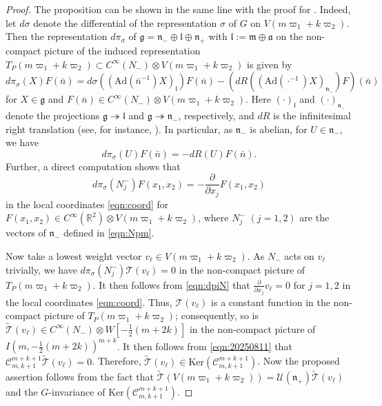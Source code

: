 \documentclass[reqno,11pt]{amsart}
\theoremstyle{remark}
\numberwithin{equation}{section}
\newcommand{\fa}{{\mathfrak a}}
\newcommand{\fg}{{\mathfrak g}}
\newcommand{\fl}{{\mathfrak l}}
\newcommand{\fm}{{\mathfrak m}}
\newcommand{\fn}{{\mathfrak n}}
\newcommand{\R}{\mathbb{R}}
\newcommand{\Ad}{\mathrm{Ad}}
\newcommand{\Cal}{\mathcal}
\newcommand{\wT}{\widetilde{\Cal{T}}}
\newcommand{\Ker}{\mathrm{Ker}}
\begin{document}
\begin{proof}
The proposition can be shown 
in the same line with the proof for \cite[Thm.\ 6.5]{KuOr25a}.
Indeed, let $d\sigma$ denote the differential of the representation $\sigma$ 
of $G$ on $V(m\varpi_1+k\varpi_2)$.
Then the representation $d\pi_\sigma$ of
$\fg=\fn_-\oplus \fl \oplus \fn_+$ with $\fl:=\fm\oplus \fa$ 
on the non-compact picture of the induced representation
$T_P(m\varpi_1 + k \varpi_2)  \subset C^\infty(N_-)\otimes V(m\varpi_1+k\varpi_2)$
is given by 
\begin{equation}\label{eqn:dpi}
d\pi_\sigma(X) F(\bar{n})= 
d\sigma((\Ad(\bar{n}^{-1})X)_{\fl})F(\bar{n})-(dR((\Ad(\cdot^{-1})X)_{\fn_-})F)(\bar{n})
\end{equation}
for $X \in \fg$ and $F(\bar{n})\in C^\infty(N_-)\otimes  V(m\varpi_1 + k \varpi_2)$.
Here $(\cdot)_{\fl}$ and $(\cdot)_{\fn_-}$ denote the projections 
$\fg \twoheadrightarrow \fl$ and 
$\fg \twoheadrightarrow \fn_-$, respectively,
and $dR$ is the infinitesimal right translation (see, for instance, \cite[(2.4)]{KuOr25a}). 
In particular, as $\fn_-$ is abelian, for $U \in \fn_-$,  we have 
\begin{equation*}
d\pi_\sigma(U)F(\bar{n})=-dR(U)F(\bar{n}).
\end{equation*}
Further, a direct computation shows that
\begin{equation}\label{eqn:dpiN}
d\pi_\sigma(N^-_j)F(x_1, x_2) = -\frac{\partial}{\partial x_j}F(x_1, x_2)
\end{equation}
in the local coordinates \eqref{eqn:coord}
for $F(x_1, x_2) \in C^\infty(\R^2) \otimes V(m\varpi_1+k\varpi_2)$,
where $N_j^-$ $(j=1,2)$ are the vectors of $\fn_-$ defined in \eqref{eqn:Npm}.

Now take a lowest weight vector $v_\ell \in V(m\varpi_1 + k \varpi_2)$.
As $N_-$ acts on $v_\ell$ trivially, we have 
$d\pi_\sigma(N_j^-)\Cal{T}(v_\ell)=0$
in the non-compact picture of 
$T_P(m\varpi_1 + k \varpi_2)$.
It then follows from \eqref{eqn:dpiN} that
$\frac{\partial}{\partial x_j} v_\ell = 0$ for $j=1, 2$
in the local coordinates \eqref{eqn:coord}. Thus, $\Cal{T}(v_\ell)$ is a constant
function in the non-compact picture of $T_P(m\varpi_1 + k \varpi_2)$;
consequently, so is
$\wT(v_\ell) \in C^\infty(N_-) \otimes  W[-\frac{1}{2}(m+2k)]$ 
in the non-compact picture of $I(m, -\tfrac{1}{2}(m+2k))^{m+k}$.
 It then follows from \eqref{eqn:20250811} that
$\Cal{C}^{m+k+1}_{m,k+1}\wT(v_\ell)=0$. Therefore,
$\wT(v_\ell) \in \Ker(\Cal{C}^{m+k+1}_{m,k+1})$.
Now the proposed assertion follows from the fact that
$\wT( V(m\varpi_1 + k \varpi_2)) = \Cal{U}(\fn_+)\wT(v_\ell)$
and the $G$-invariance of $\Ker(\Cal{C}^{m+k+1}_{m,k+1})$.
\end{proof}
\end{document}
